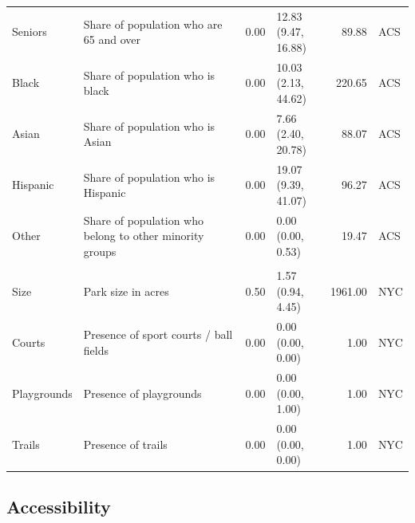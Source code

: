 \documentclass[shortAfour,sageh.bst]{sagej}
\begin{document}
\begin{table}
{\begin{tabular}[t]{l>{\raggedright\arraybackslash}p{2in}rlrl}
\hspace{1em}Seniors & Share of population who are 65 and over & 0.00 & \makecell{12.83\\ (9.47, 16.88)} & 89.88 & ACS\\
\hspace{1em}Black & Share of population who is black & 0.00 & \makecell{10.03\\ (2.13, 44.62)} & 220.65 & ACS\\
\hspace{1em}Asian & Share of population who is Asian & 0.00 & \makecell{7.66\\ (2.40, 20.78)} & 88.07 & ACS\\
\hspace{1em}Hispanic & Share of population who is Hispanic & 0.00 & \makecell{19.07\\ (9.39, 41.07)} & 96.27 & ACS\\
\hspace{1em}Other & Share of population who belong to other minority groups & 0.00 & \makecell{0.00\\ (0.00, 0.53)} & 19.47 & ACS\\
\addlinespace[0.3em]
\multicolumn{6}{l}{\textbf{Park Variables, N = 1191}}\\
\hspace{1em}Size & Park size in acres & 0.50 & \makecell{1.57\\ (0.94, 4.45)} & 1961.00 & NYC\\
\hspace{1em}Courts & Presence of sport courts / ball fields & 0.00 & \makecell{0.00\\ (0.00, 0.00)} & 1.00 & NYC\\
\hspace{1em}Playgrounds & Presence of playgrounds & 0.00 & \makecell{0.00\\ (0.00, 1.00)} & 1.00 & NYC\\
\hspace{1em}Trails & Presence of trails & 0.00 & \makecell{0.00\\ (0.00, 0.00)} & 1.00 & NYC\\
\bottomrule
\end{tabular}}
\end{table}

\hypertarget{accessibility}{%
\subsection{Accessibility}\label{accessibility}}
\end{document}

